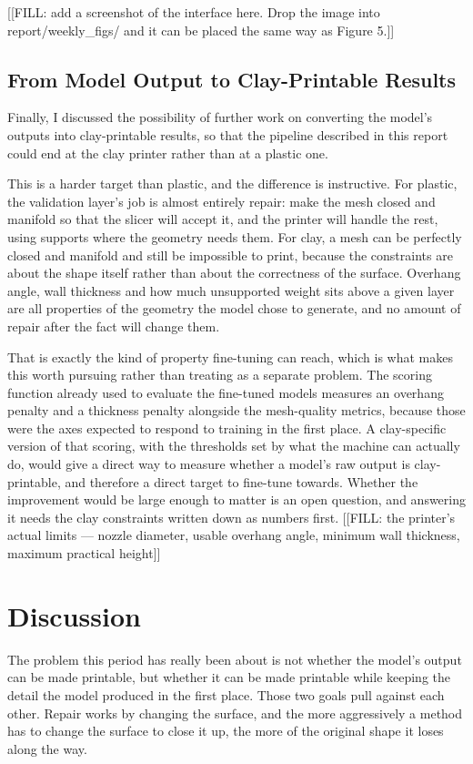 \documentclass[11pt,a4paper]{article}
\begin{document}
[[FILL: add a screenshot of the interface here. Drop the image into report/weekly\_figs/ and it can be placed the same way as Figure 5.]]

\subsection{From Model Output to Clay-Printable Results}
Finally, I discussed the possibility of further work on converting the model's outputs into clay-printable results, so that the pipeline described in this report could end at the clay printer rather than at a plastic one.

This is a harder target than plastic, and the difference is instructive. For plastic, the validation layer's job is almost entirely repair: make the mesh closed and manifold so that the slicer will accept it, and the printer will handle the rest, using supports where the geometry needs them. For clay, a mesh can be perfectly closed and manifold and still be impossible to print, because the constraints are about the shape itself rather than about the correctness of the surface. Overhang angle, wall thickness and how much unsupported weight sits above a given layer are all properties of the geometry the model chose to generate, and no amount of repair after the fact will change them.

That is exactly the kind of property fine-tuning can reach, which is what makes this worth pursuing rather than treating as a separate problem. The scoring function already used to evaluate the fine-tuned models measures an overhang penalty and a thickness penalty alongside the mesh-quality metrics, because those were the axes expected to respond to training in the first place. A clay-specific version of that scoring, with the thresholds set by what the machine can actually do, would give a direct way to measure whether a model's raw output is clay-printable, and therefore a direct target to fine-tune towards. Whether the improvement would be large enough to matter is an open question, and answering it needs the clay constraints written down as numbers first. [[FILL: the printer's actual limits --- nozzle diameter, usable overhang angle, minimum wall thickness, maximum practical height]]


\section{Discussion}
The problem this period has really been about is not whether the model's output can be made printable, but whether it can be made printable while keeping the detail the model produced in the first place. Those two goals pull against each other. Repair works by changing the surface, and the more aggressively a method has to change the surface to close it up, the more of the original shape it loses along the way.
\end{document}
